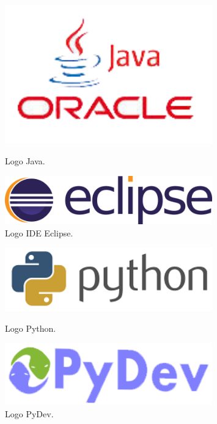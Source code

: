 \documentclass[twoside,12pt]{report}
\begin{document}
\begin{figure}[h]
\begin{flushleft}
	\begin{minipage}[]{.47\textwidth}
	\centering
	\includegraphics[width=0.8\textwidth]{img/java}
	\caption{Logo Java.}
\end{minipage}%
\end{flushleft}
\begin{flushright}
	\begin{minipage}[]{.47\textwidth}
	\centering
	\includegraphics[width=0.8\textwidth]{img/eclipse}
	\caption{Logo IDE Eclipse.}	
	\end{minipage}
\end{flushright}
\end{figure}

\begin{figure}[h]
\begin{flushleft}
	\begin{minipage}[]{.47\textwidth}
	\vspace*{30px}
	\centering
	\includegraphics[width=0.8\textwidth]{img/py}
	\caption{Logo Python.}
	\end{minipage}%
\end{flushleft}
\begin{flushright}
	\begin{minipage}[]{.47\textwidth}
	\centering
	\includegraphics[width=0.8\textwidth]{img/pydev}
	\caption{Logo PyDev.}
	\end{minipage}
\end{flushright}
\end{figure}
\end{document}
